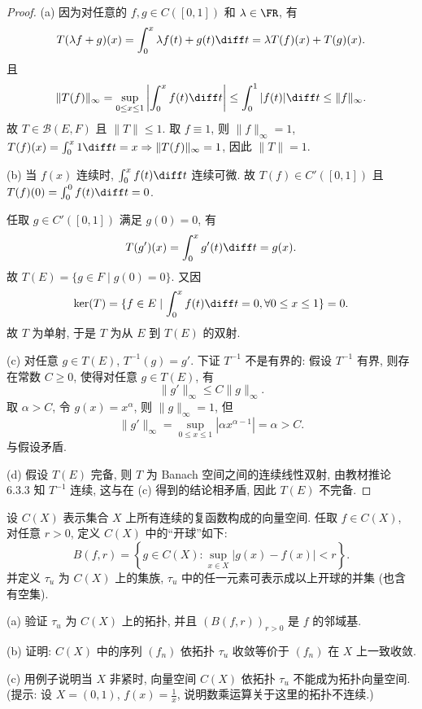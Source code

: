 \documentclass{mathexercise}
\begin{document}
\begin{proof}
    (a) 因为对任意的 $f,g\in C([0,1])$ 和 $\lambda\in\FR$, 有
    \[T(\lambda f+g)(x)=\int_0^x \lambda f(t)+g(t)\diff t=\lambda T(f)(x)+T(g)(x).\]
    且
    \[\|T(f)\|_{\infty}=\sup_{0\leq x\leq 1}\left|\int_0^x f(t)\diff t\right|\leq\int_0^1 |f(t)|\diff t\leq\|f\|_{\infty}.\]
    故 $T\in\mathcal{B}(E,F)$ 且 $\|T\|\leq 1$. 取 $f\equiv 1$, 则 $\|f\|_{\infty}=1$,
    $T(f)(x)=\int_0^x 1\diff t=x\Rightarrow\|T(f)\|_{\infty}=1$, 因此 $\|T\|=1$.

    (b) 当 $f(x)$ 连续时, $\int_0^x f(t)\diff t$ 连续可微.
    故 $T(f)\in C'([0,1])$ 且 $T(f)(0)=\int_0^0 f(t)\diff t=0$.

    任取 $g\in C'([0,1])$ 满足 $g(0)=0$, 有
    \[T(g')(x)=\int_0^x g'(t)\diff t=g(x).\]
    故 $T(E)=\{g\in F\mid g(0)=0\}$. 又因
    \[\ker(T)=\{f\in E\mid \int_0^x f(t)\diff t=0, \forall 0\leq x\leq 1\}=0.\]
    故 $T$ 为单射, 于是 $T$ 为从 $E$ 到 $T(E)$ 的双射.

    (c) 对任意 $g\in T(E)$, $T^{-1}(g)=g'$. 下证 $T^{-1}$ 不是有界的:
    假设 $T^{-1}$ 有界, 则存在常数 $C\geq 0$, 使得对任意 $g\in T(E)$, 有
    \[\|g'\|_{\infty}\leq C\|g\|_{\infty}.\]
    取 $\alpha>C$, 令 $g(x)=x^{\alpha}$, 则 $\|g\|_{\infty}=1$, 但
    \[\|g'\|_{\infty}=\sup_{0\leq x\leq 1}|\alpha x^{\alpha-1}|=\alpha>C.\]
    与假设矛盾.

    (d) 假设 $T(E)$ 完备, 则 $T$ 为 Banach 空间之间的连续线性双射, 由教材推论 6.3.3
    知 $T^{-1}$ 连续, 这与在 (c) 得到的结论相矛盾, 因此 $T(E)$ 不完备.
\end{proof}





\begin{exercise}
    设 $C(X)$ 表示集合 $X$ 上所有连续的复函数构成的向量空间. 任取 $f\in C(X)$, 对任意 $r>0$, 定义 $C(X)$ 中的“开球”如下:
    \[
    B(f, r)=\left\{g\in C(X): \sup_{x\in X}|g(x)-f(x)|<r\right\}.
    \]
    并定义 $\tau_{u}$ 为 $C(X)$ 上的集族, $\tau_{u}$ 中的任一元素可表示成以上开球的并集 (也含有空集).

    (a) 验证 $\tau_{u}$ 为 $C(X)$ 上的拓扑, 并且 $(B(f,r))_{r>0}$ 是 $f$ 的邻域基.

    (b) 证明: $C(X)$ 中的序列 $(f_n)$ 依拓扑 $\tau_{u}$ 收敛等价于 $(f_n)$ 在 $X$ 上一致收敛.

    (c) 用例子说明当 $X$ 非紧时, 向量空间 $C(X)$ 依拓扑 $\tau_{u}$ 不能成为拓扑向量空间. 
    (提示: 设 $X=(0,1)$, $f(x)=\frac{1}{x}$, 说明数乘运算关于这里的拓扑不连续.)
\end{exercise}
\end{document}
